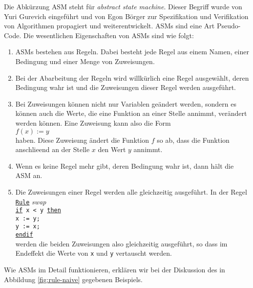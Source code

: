 Die Abk\"urzung \textsc{ASM} steht f\"ur \emph{abstract state machine}.
Dieser Begriff wurde von 
Yuri Gurevich \cite{gurevich:91} eingef\"uhrt und von Egon B\"orger \cite{boerger:2003} zur
Spezifikation und Verifikation von 
Algorithmen  propagiert und weiterentwickelt.  ASMs sind eine Art Pseudo-Code.  Die 
wesentlichen Eigenschaften von ASMs sind wie folgt:
\begin{enumerate}
\item ASMs bestehen aus Regeln.  Dabei besteht jede Regel
      aus einem Namen, einer Bedingung und einer Menge von Zuweisungen.
\item Bei der Abarbeitung der Regeln wird willk\"urlich eine Regel ausgew\"ahlt, deren
      Bedingung wahr ist und die Zuweisungen dieser Regel werden ausgef\"uhrt.
\item Bei Zuweisungen k\"onnen nicht nur Variablen ge\"andert werden, sondern es k\"onnen auch die Werte,
      die eine Funktion an einer Stelle annimmt, ver\"andert werden k\"onnen.  Eine Zuweisung
      kann also die Form
      \\[0.2cm]
      \hspace*{1.3cm}
      $f(x) := y$
      \\[0.2cm]
      haben.  Diese Zuweisung \"andert die Funktion $f$ so ab, dass die Funktion anschlie\3end an der Stelle $x$
      den Wert $y$ annimmt.
\item Wenn es keine Regel mehr gibt, deren Bedingung wahr ist, dann h\"alt die ASM an.
\item Die Zuweisungen einer Regel werden alle gleichzeitig ausgef\"uhrt.  In der Regel 
      \\[0.2cm]
      \hspace*{0.8cm} \texttt{\underline{Rule}} \textsl{swap}            \\
      \hspace*{1.3cm} \texttt{\underline{if} x < y \underline{then}}     \\
      \hspace*{1.8cm} \texttt{x := y;}                                   \\
      \hspace*{1.8cm} \texttt{y := x;}                                   \\
      \hspace*{1.3cm} \texttt{\underline{endif}}                         \\[0.2cm]
      werden die beiden Zuweisungen also gleichzeitig ausgef\"uhrt, so dass im Endeffekt die
      Werte von \texttt{x} und \texttt{y} vertauscht werden.
\end{enumerate}
Wie ASMs im Detail funktionieren, erkl\"aren wir bei der Diskussion des in Abbildung
\ref{fig:rule-naive} gegebenen Beispiels.

